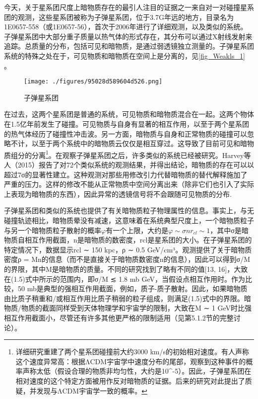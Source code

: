 

今天，关于星系团尺度上暗物质存在的最引人注目的证据之一来自对一对碰撞星系团的观测，这些星系团被称为子弹星系团，位于3.7G年远的地方，目录名为1E0657-558（或1E0657-56），首次于2006年进行了详细观测，以及类似的系统。子弹星系团中大部分重子质量以热气体的形式存在，其分布可以通过X射线发射来追踪。总质量的分布，包括可见和暗物质，是通过弱透镜独立测量的。子弹星系团系统的特殊之处在于，可见物质和暗物质在空间上是分离的，见\autoref{fig_Weakls_1} 。\begin{figure}[ht]
\centering
\texttt{[image: ./figures/95028d589604d526.png]}
\caption{子弹星系团} \label{fig_Weakls_1}
\end{figure}
在过去，这两个星系团是普通的系统，可见物质和暗物质混合在一起。这两个物体在1.5亿年前发生了碰撞。可见物质与自身有显著的相互作用，以至于两个星系团的热气体经历了碰撞性冲击波。另一方面，暗物质与自身和正常物质的碰撞可以忽略不计，以至于两个系统中的暗物质云仅仅是相互穿过。这导致了目前可见和暗物质组分的分离\footnote{详细研究重建了两个星系团碰撞前大约3000 km/s的初始相对速度。有人声称这个速度异常高：根据ΛCDM宇宙学中速度分布的尾部，观察到这种事件的概率声称太低（假设合理的物质非均匀性，大约是10^-5）。因此，子弹星系团在相对速度的这个特定方面被用作反对暗物质的证据。后来的研究对此提出了质疑，并发现与ΛCDM宇宙学一致的概率。}。在观察子弹星系团之后，许多类似的系统已经被研究。Harvey等人（2015）报告了对72个类似系统的观测结果，并得出结论，暗物质的存在可以以超过7σ的显著性建立。这种观测对那些用修改引力代替暗物质的替代解释施加了严重的压力。这样的修改不能从正常物质中空间分离出来（除非它们也引入了实际上表现为暗物质的东西），因此异常的透镜信号将不会跟随可见物质的分布.

子弹星系团和类似的系统也提供了有关暗物质粒子物理属性的信息。事实上，与无碰撞轨迹相比，暗物质晕没有减速，这意味着在系统典型尺度上，一个暗物质粒子与另一个暗物质粒子散射的概率$\varphi$有一个上限，大约是$\varphi \sim \sigma n r_{cl}\sim 1$，其中σ$$是暗物质自相互作用截面，n是暗物质的数密度，rcl是星系团的大小。在子弹星系团的特定情况下，数据显示rcl ∼ 150 kpc，ρ ∼ 0.5 GeV/cm³。观测提供了关于暗物质密度ρ = Mn的信息（而不是直接关于暗物质数密度n的信息），因此可以得到σ/M的界限，其中M是暗物质的质量。不同的研究找到了略有不同的值[13, 16]，大致在(1.5)式中所示的范围内，即σ/M ≲ 1.8 mb GeV，当假设点相互作用时。作为比较，50 mb是典型的强相互作用截面，例如，质子-质子散射。因此，如果暗物质由比质子稍重和/或相互作用比质子稍弱的粒子组成，则满足(1.5)式中的界限。暗物质/物质的截面同样受到天体物理学和宇宙学的限制，大致在M ∼ 1 GeV时比强相互作用截面小，尽管还有许多其他更严格的限制适用（见第5.1.2节的完整讨论）。

